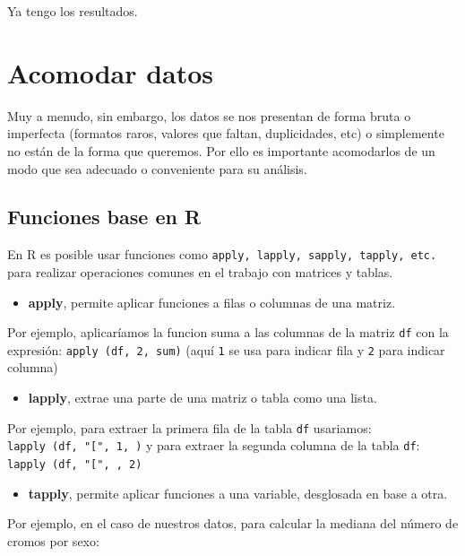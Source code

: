 \documentclass[]{book}
\providecommand{\tightlist}{%
  \setlength{\itemsep}{0pt}\setlength{\parskip}{0pt}}
\theoremstyle{definition}
\theoremstyle{definition}
\theoremstyle{definition}
\theoremstyle{remark}
\begin{document}
Ya tengo los resultados.

\hypertarget{acomodar-datos}{%
\section{Acomodar datos}\label{acomodar-datos}}

Muy a menudo, sin embargo, los datos se nos presentan de forma bruta o
imperfecta (formatos raros, valores que faltan, duplicidades, etc) o
simplemente no están de la forma que queremos. Por ello es importante
acomodarlos de un modo que sea adecuado o conveniente para su análisis.

\hypertarget{funciones-base-en-r}{%
\subsection{Funciones base en R}\label{funciones-base-en-r}}

En R es posible usar funciones como
\texttt{apply,\ lapply,\ sapply,\ tapply,\ etc.} para realizar
operaciones comunes en el trabajo con matrices y tablas.

\begin{itemize}
\tightlist
\item
  \textbf{apply}, permite aplicar funciones a filas o columnas de una
  matriz.
\end{itemize}

Por ejemplo, aplicaríamos la funcion suma a las columnas de la matriz
\texttt{df} con la expresión: \texttt{apply\ (df,\ 2,\ sum)} (aquí
\texttt{1} se usa para indicar fila y \texttt{2} para indicar columna)

\begin{itemize}
\tightlist
\item
  \textbf{lapply}, extrae una parte de una matriz o tabla como una
  lista.
\end{itemize}

Por ejemplo, para extraer la primera fila de la tabla \texttt{df}
usariamos: \texttt{lapply\ (df,\ "{[}",\ 1,\ )} y para extraer la
segunda columna de la tabla \texttt{df}:
\texttt{lapply\ (df,\ "{[}",\ ,\ 2)}

\begin{itemize}
\tightlist
\item
  \textbf{tapply}, permite aplicar funciones a una variable, desglosada
  en base a otra.
\end{itemize}

Por ejemplo, en el caso de nuestros datos, para calcular la mediana del
número de cromos por sexo:
\end{document}

